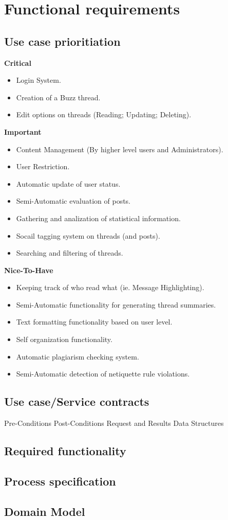 \documentclass[a4paper,12pt]{report}
\begin{document}
\section{Functional requirements}
\subsection{Use case prioritiation}
\textbf{Critical} 
\begin{itemize}
  \item Login System.
  \item Creation of a Buzz thread.
  \item Edit options on threads (Reading; Updating; Deleting).
\end{itemize}
\textbf{Important} 
\begin{itemize}
  \item Content Management (By higher level users and Administrators).
  \item User Restriction.
  \item Automatic update of user status.
  \item Semi-Automatic evaluation of posts.
  \item Gathering and analization of statistical information.
  \item Socail tagging system on threads (and posts).
  \item Searching and filtering of threads.
\end{itemize}
\textbf{Nice-To-Have} 
\begin{itemize}
  \item Keeping track of who read what (ie. Message Highlighting).
  \item Semi-Automatic functionality for generating thread summaries.
  \item Text formatting functionality based on user level.
  \item Self organization functionality.
  \item Automatic plagiarism checking system.
  \item Semi-Automatic detection of netiquette rule violations.
\end{itemize}
\subsection{Use case/Service contracts}
Pre-Conditions
Post-Conditions
Request and Results Data Structures
\subsection{Required functionality}
\subsection{Process specification}
\subsection{Domain Model}

\newpage


{} %

\end{document}
